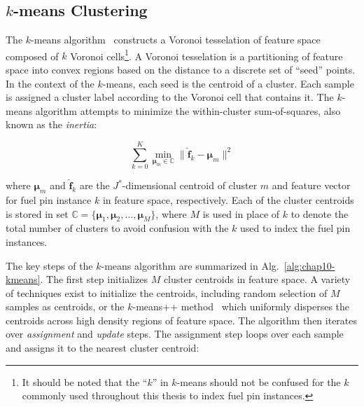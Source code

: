 
\subsection{$k$-means Clustering}
\label{subsec:chap10-kmeans}

The $k$-means algorithm~\cite{macqueen1967kmeans, lloyd1982kmeans} constructs a Voronoi tesselation of feature space composed of $k$ Voronoi cells\footnote{It should be noted that the ``$k$'' in $k$-means should not be confused for the $k$ commonly used throughout this thesis to index fuel pin instances.}. A Voronoi tesselation is a partitioning of feature space into convex regions based on the distance to a discrete set of ``seed'' points. In the context of the $k$-means, each seed is the centroid of a cluster. Each sample is assigned a cluster label according to the Voronoi cell that contains it. The $k$-means algorithm attempts to minimize the within-cluster sum-of-squares, also known as the \textit{inertia}:

\begin{equation}
\label{eqn:chap10-kmeans-inertia}
\displaystyle\sum\limits_{k=0}^{K} \min_{\boldsymbol{\mu}_{m} \in \mathbb{C}} \|\boldsymbol{\hat{f}}_{k} - \boldsymbol{\mu}_{m}\|^{2}
\end{equation}

\noindent where $\boldsymbol{\mu}_{m}$ and $\boldsymbol{\hat{f}}_{k}$ are the $J^{*}$-dimensional centroid of cluster $m$ and feature vector for fuel pin instance $k$ in feature space, respectively. Each of the cluster centroids is stored in set $\mathbb{C} = \lbrace \boldsymbol{\mu}_{1}, \boldsymbol{\mu}_{2}, \dots, \boldsymbol{\mu}_{M} \rbrace$, where $M$ is used in place of $k$ to denote the total number of clusters to avoid confusion with the $k$ used to index the fuel pin instances.

The key steps of the $k$-means algorithm are summarized in Alg.~\ref{alg:chap10-kmeans}. The first step initializes $M$ cluster centroids in feature space. A variety of techniques exist to initialize the centroids, including random selection of $M$ samples as centroids, or the $k$-means++ method~\cite{arthur2007kmeans++} which uniformly disperses the centroids across high density regions of feature space. The algorithm then iterates over \textit{assignment} and \textit{update} steps. The assignment step loops over each sample and assigns it to the nearest cluster centroid:

